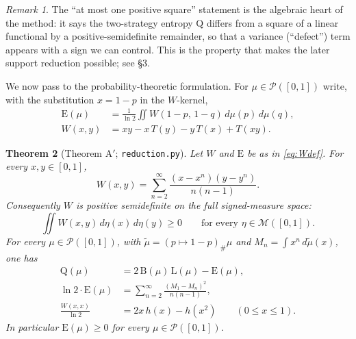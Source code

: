 \documentclass[11pt]{article}
\theoremstyle{plain}
\newtheorem{theorem}{Theorem}[section]
\theoremstyle{definition}
\theoremstyle{remark}
\newtheorem{remark}[theorem]{Remark}
\newcommand{\PP}{\mathcal P}
\newcommand{\Lb}{\mathrm{L}}
\newcommand{\Bb}{\mathrm{B}}
\newcommand{\Qq}{\mathrm{Q}}
\newcommand{\Ee}{\mathrm{E}}
\newcommand{\MM}{\mathcal M}
\begin{document}
\begin{remark}
The ``at most one positive square'' statement is the algebraic heart of the method:
it says the two-strategy entropy $\Qq$ differs from a square of a linear
functional by a positive-semidefinite remainder, so that a variance
(``defect'') term appears with a sign we can control. This is the property that
makes the later support reduction possible; see \S3.
\end{remark}

We now pass to the probability-theoretic formulation.  For
$\mu\in\PP([0,1])$ write, with the substitution $x=1-p$ in the $W$-kernel,
\begin{equation}
\begin{split}
\Ee(\mu)&=\frac1{\ln2}\iint W(1-p,\,1-q)\,d\mu(p)\,d\mu(q),\\
W(x,y)&=xy-x\,T(y)-y\,T(x)+T(xy).
\end{split}
\label{eq:Wdef}
\end{equation}

\begin{theorem}[Theorem A${}'$; \texttt{reduction.py}]
\label{thm:Ap}
Let $W$ and $\Ee$ be as in \eqref{eq:Wdef}.  For every $x,y\in[0,1]$,
\begin{equation}
W(x,y)=\sum_{n=2}^{\infty}\frac{(x-x^n)(y-y^n)}{n(n-1)}.
\label{eq:Wseries}
\end{equation}
Consequently $W$ is positive semidefinite on the full signed-measure space:
\[
\iint W(x,y)\,d\eta(x)\,d\eta(y)\ge0
\qquad\text{for every }\eta\in\MM([0,1]).
\]
For every $\mu\in\PP([0,1])$, with
$\widetilde\mu=(p\mapsto1-p)_\#\mu$ and
$M_n=\int x^n\,d\widetilde\mu(x)$, one has
\begin{align}
\Qq(\mu) &= 2\,\Bb(\mu)\,\Lb(\mu)-\Ee(\mu), \label{eq:Q2BL}\\
\ln2\cdot\Ee(\mu) &= \sum_{n=2}^{\infty}\frac{(M_1-M_n)^2}{n(n-1)},
  \label{eq:Emoment}\\
\frac{W(x,x)}{\ln2} &= 2x\,h(x)-h(x^2)\qquad(0\le x\le1).
\label{eq:Wdiag}
\end{align}
In particular $\Ee(\mu)\ge0$ for every $\mu\in\PP([0,1])$.
\end{theorem}
\end{document}
